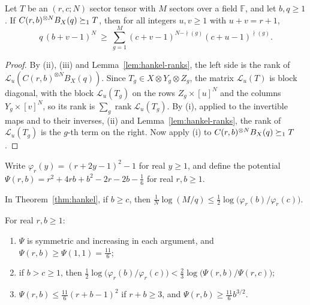 \begin{theorem}\label{thm:hankel}
Let \(T\) be an \((r,c;N)\) sector tensor with \(M\) sectors over a
field \(\mathbb F\), and let \(b,q\ge1\). If
\(C(r,b)^{\otimes N}B_X(q)\succeq_1T\), then for all integers \(u,v\ge1\)
with \(u+v=r+1\),
\begin{equation}\label{eq:hankel-bound}
 q\,(b+v-1)^N\ \ge\ \sum_{g=1}^M(c+v-1)^{N-\nmid(g)}(c+u-1)^{\nmid(g)} .
\end{equation}
\end{theorem}

\begin{proof}
By (ii), (iii) and Lemma~\ref{lem:hankel-ranks}, the left side is the
rank of \(\mathcal L_u(C(r,b)^{\otimes N}B_X(q))\). Since
\(T_g\in X\otimes Y_g\otimes Z_g\), the matrix \(\mathcal L_u(T)\) is
block diagonal, with the block \(\mathcal L_u(T_g)\) on the rows
\(Z_g\times[u]^N\) and the columns \(Y_g\times[v]^N\), so its rank is
\(\sum_g\operatorname{rank}\mathcal L_u(T_g)\). By (i), applied to the
invertible maps and to their inverses, (ii) and
Lemma~\ref{lem:hankel-ranks}, the rank of \(\mathcal L_u(T_g)\) is the
\(g\)-th term on the right. Now apply (i) to
\(C(r,b)^{\otimes N}B_X(q)\succeq_1T\).
\end{proof}

Write \(\varphi_r(y)=(r+2y-1)^2-1\) for real \(y\ge1\), and define the
potential \(\Psi(r,b)=r^2+4rb+b^2-2r-2b-\frac16\) for real \(r,b\ge1\).

\begin{lemma}\label{lem:hankel-gain}
In Theorem~\ref{thm:hankel}, if \(b\ge c\), then
\(\frac1N\log(M/q)\le\frac12\log\bigl(\varphi_r(b)/\varphi_r(c)\bigr)\).
\end{lemma}

\begin{lemma}[Potential]\label{lem:hankel-potential}
For real \(r,b\ge1\):
\begin{enumerate}
\item[(a)] \(\Psi\) is symmetric and increasing in each argument, and
\(\Psi(r,b)\ge\Psi(1,1)=\frac{11}6\);
\item[(b)] if \(b>c\ge1\), then
\(\frac12\log\bigl(\varphi_r(b)/\varphi_r(c)\bigr)<\frac23\log\bigl(\Psi(r,b)/\Psi(r,c)\bigr)\);
\item[(c)] \(\Psi(r,b)\le\frac{11}6(r+b-1)^2\) if \(r+b\ge3\), and
\(\Psi(r,b)\ge\frac{11}6b^{3/2}\).
\end{enumerate}
\end{lemma}


